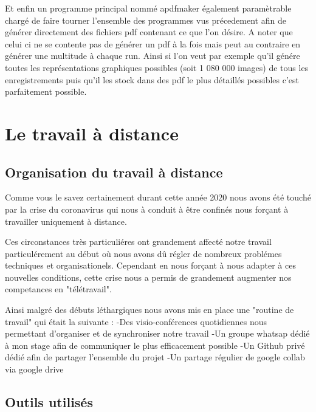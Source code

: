 Et enfin un programme principal nommé apdfmaker également paramètrable chargé de faire tourner l'ensemble des programmes vus précedement afin de générer directement des fichiers pdf contenant ce que l'on désire. A noter que celui ci ne se contente pas de générer un pdf à la fois mais peut au contraire en générer une multitude à chaque run. Ainsi si l'on veut par exemple qu'il génére toutes les représentations graphiques possibles (soit 1 080 000 images) de tous les enregistrements puis qu'il les stock dans des pdf le plus détaillés possibles c'est parfaitement possible.


\hypertarget{Le-travail-a-distance}{%
\chapter{Le travail à distance}\label{Le-travail-a-distance}}

\hypertarget{Organisation-du-travail-a-distance}{%
\section{Organisation du travail à distance}\label{Organisation-du-travail-a-distance}}


Comme vous le savez certainement durant cette année 2020 nous avons été touché par la crise du coronavirus qui nous à conduit à être confinés nous forçant à travailler uniquement à distance.

Ces circonstances très particuliéres ont grandement affecté notre travail particulérement au début où nous avons dû régler de nombreux problémes techniques et organisationels. Cependant en nous forçant à nous adapter à ces nouvelles conditions, cette crise nous a permis de grandement augmenter nos competances en "télétravail".

Ainsi malgré des débuts léthargiques nous avons mis en place une "routine de travail" qui était la suivante :
-Des visio-conférences quotidiennes nous permettant d'organiser et de synchroniser notre travail
-Un groupe whatsap dédié à mon stage afin de communiquer le plus efficacement possible
-Un Github privé dédié afin de partager l'ensemble du projet
-Un partage régulier de google collab via google drive


\hypertarget{Outils-utilisuxe9s}{%
\section{Outils utilisés}
\label{Outils-utilisuxe9s}}

